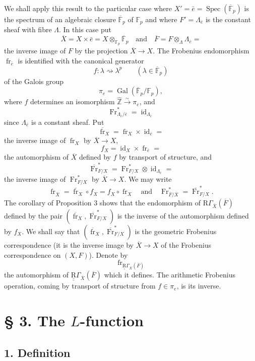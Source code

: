 \documentclass[11pt]{article}
\DeclareMathOperator{\Spec}{Spec}
\providecommand{\Gal}{\operatorname{Gal}}
\providecommand{\RGamma}{\mathrm R\Gamma}
\providecommand{\id}{\operatorname{id}}
\providecommand{\id}{\operatorname{id}}
\providecommand{\id}{\operatorname{id}}
\providecommand{\RGamma}{\mathrm R\Gamma}
\providecommand{\id}{\operatorname{id}}
\providecommand{\Spec}{\operatorname{Spec}}
\providecommand{\Spec}{\operatorname{Spec}}
\providecommand{\id}{\operatorname{id}}
\providecommand{\Spec}{\operatorname{Spec}}
\providecommand{\fr}{\operatorname{fr}}
\providecommand{\Fr}{\operatorname{Fr}}
\providecommand{\Fr}{\operatorname{Fr}}
\providecommand{\fr}{\operatorname{fr}}
\providecommand{\Spec}{\operatorname{Spec}}
\providecommand{\id}{\operatorname{id}}
\providecommand{\RGamma}{\mathrm R\Gamma}
\providecommand{\Gal}{\operatorname{Gal}}
\begin{document}
We shall apply this result to the particular case where
$X'=\bar e=\Spec(\overline{\mathbb F}_p)$ is the spectrum of an
algebraic closure $\overline{\mathbb F}_p$ of $\mathbb F_p$ and where
$F'=\Lambda_{\bar e}$ is the constant sheaf with fibre $\Lambda$.
In this case put
\[
\overline X=X\times\bar e
=X\otimes_{\mathbb F_p}\overline{\mathbb F}_p
\quad\text{and}\quad
\overline F=F\otimes_\Lambda\Lambda_{\bar e}=
\]
the inverse image of $F$ by the projection $\overline X\to X$.
The Frobenius endomorphism $\fr_{\bar e}$ is identified with the
canonical generator
\[
f:\lambda\rightsquigarrow\lambda^p
\qquad(\lambda\in\overline{\mathbb F}_p)
\]
of the Galois group
\[
\pi_e=\Gal(\overline{\mathbb F}_p/\mathbb F_p),
\]
where $f$ determines an isomorphism
$\widehat{\mathbb Z}\xrightarrow{\sim}\pi_e$, and
\[
\Fr^*_{\Lambda_{\bar e}/\bar e}=\id_{\Lambda_{\bar e}}
\]
since $\Lambda_{\bar e}$ is a constant sheaf. Put
\[
\overline{\fr}_X=\fr_X\times\id_{\bar e}=
\]
the inverse image of $\fr_X$ by $\overline X\to X$,
\[
f_X=\id_X\times\fr_{\bar e}=
\]
the automorphism of $\overline X$ defined by $f$ by transport of
structure, and
\[
\overline{\Fr}^*_{F/X}
=\Fr^*_{F/X}\otimes\id_{\Lambda_{\bar e}}=
\]
the inverse image of $\Fr^*_{F/X}$ by $\overline X\to X$. We may write
\[
\fr_{\overline X}
=\overline{\fr}_X\circ f_X
=f_X\circ{\fr}_X
\quad\text{and}\quad
\Fr^*_{\overline F/\overline X}
=\overline{\Fr}^*_{F/X}.
\]
The corollary of Proposition 3 shows that the endomorphism of
$\RGamma_{\overline X}(\overline F)$ defined by the pair
$(\overline{\fr}_X,\overline{\Fr}^*_{F/X})$ is the inverse of the
automorphism defined by $f_X$. We shall say that
$(\overline{\fr}_X,\overline{\Fr}^*_{F/X})$ is the geometric
Frobenius correspondence (it is the inverse image by
$\overline X\to X$ of the Frobenius correspondence on $(X,F)$). Denote by
\[
\fr_{\underline{\underline{\mathrm{R}}}\Gamma_{\overline X}(\overline F)}
\]
the automorphism of $\underline{\underline{\mathrm{R}}}\Gamma_{\overline X}(\overline F)$ which it
defines. The arithmetic Frobenius operation, coming by transport of
structure from $f\in\pi_e$, is its inverse.

\section*{§ 3. The $L$-function}

\subsection*{1. Definition}
\end{document}
